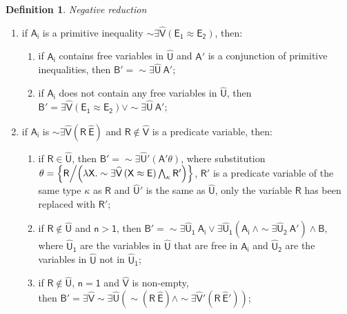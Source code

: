 \documentclass[inscr,ack,preface]{dithesis}
\theoremstyle{definition}
\newtheorem{definition}{Definition}[]
\newcommand{\msf}[1]{$\mathsf{#1}$}
\begin{document}
\begin{definition}{\emph{Negative reduction}}
\begin{enumerate}
        then \msf{B' = \sim \exists \widehat{U} \left( A_1 \land \dots \land A_i' \land \dots \land A_n \right)};
  \item if \msf{A_i} is a primitive inequality \msf{\sim \exists \widehat{V} \left( E_1 \approx E_2 \right)}, then:
        \begin{enumerate}
          \item if \msf{A_i} contains free variables in \msf{\widehat{U}} and \msf{A'} is a conjunction of primitive inequalities, then \msf{B' = \sim \exists \widehat{U} ~ A'};
          \item if \msf{A_i} does not contain any free variables in \msf{\widehat{U}}, then \msf{B' = \exists \widehat{V} \left( E_1 \approx E_2 \right) \lor \sim \exists \widehat{U} ~ A'};
        \end{enumerate}
  \item if \msf{A_i} is \msf{\sim \exists \widehat{V} \left( R ~ \widehat{E} \right)} and \msf{R \not\in \widehat{V}} is a predicate variable,
        then:
        \begin{enumerate}
          \item if \msf{R \in \widehat{U}},
                then \msf{B' = \sim \exists \widehat{U}' \left( A' \theta \right)},
                where substitution \\ \msf{\theta = \left\{ R \middle/ \left( \lambda X . \sim \exists \widehat{V} \left( X \approx E \right) \bigwedge_{\kappa} R' \right) \right\}},
                \msf{R'} is a predicate variable of the same type \msf{\kappa} as \msf{R}
                and \msf{\widehat{U}'} is the same as \msf{\widehat{U}}, only the variable \msf{R} has been replaced with \msf{R'};
          \item if \msf{R \not\in \widehat{U}} and \msf{n > 1},
                then \msf{B' = \sim \exists \widehat{U}_1 ~ A_i \lor \exists \widehat{U}_1 \left( A_i ~ \land \sim \exists \widehat{U}_2 ~ A' \right) \land B},
                where \msf{\widehat{U}_1} are the variables in \msf{\widehat{U}} that are free in \msf{A_i} and \msf{\widehat{U}_2} are the variables in \msf{\widehat{U}} not in \msf{\widehat{U}_1};
          \item if \msf{R \not\in \widehat{U}}, \msf{n = 1} and \msf{\widehat{V}} is non-empty, \\
                then \msf{B' = \exists \widehat{V} \sim \exists \widehat{U} \left( \sim \left( R ~ \widehat{E} \right) \land \sim \exists \widehat{V}' \left( R ~ \widehat{E}' \right) \right)};
        \end{enumerate}

\end{enumerate}
\end{definition}
\end{document}
